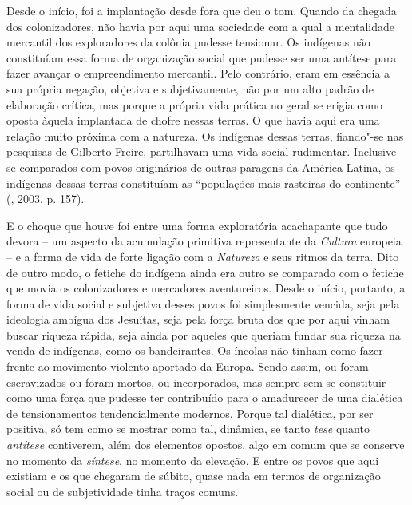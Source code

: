 Desde o início, foi a implantação desde fora que deu o tom. Quando da
chegada dos colonizadores, não havia por aqui uma sociedade com a qual a
mentalidade mercantil dos exploradores da colônia pudesse tensionar. Os
indígenas não constituíam essa forma de organização social que pudesse
ser uma antítese para fazer avançar o empreendimento mercantil. Pelo
contrário, eram em essência a sua própria negação, objetiva e
subjetivamente, não por um alto padrão de elaboração crítica, mas porque
a própria vida prática no geral se erigia como oposta àquela implantada
de chofre nessas terras. O que havia aqui era uma relação muito próxima
com a natureza. Os indígenas dessas terras, fiando"-se nas pesquisas de
Gilberto Freire, partilhavam uma vida social rudimentar. Inclusive se
comparados com povos originários de outras paragens da América Latina,
os indígenas dessas terras constituíam as ``populações mais rasteiras do
continente'' (, 2003, p. 157).

E o choque que houve foi entre uma forma exploratória acachapante que
tudo devora -- um aspecto da acumulação primitiva representante da
\emph{Cultura} europeia -- e a forma de vida de forte ligação com a
\emph{Natureza} e seus ritmos da terra. Dito de outro modo, o fetiche do
indígena ainda era outro se comparado com o fetiche que movia os
colonizadores e mercadores aventureiros. Desde o início, portanto, a
forma de vida social e subjetiva desses povos foi simplesmente vencida,
seja pela ideologia ambígua dos Jesuítas, seja pela força bruta dos que
por aqui vinham buscar riqueza rápida, seja ainda por aqueles que
queriam fundar sua riqueza na venda de indígenas, como os bandeirantes.
Os íncolas não tinham como fazer frente ao movimento violento aportado
da Europa. Sendo assim, ou foram escravizados ou foram mortos, ou
incorporados, mas sempre sem se constituir como uma força que pudesse
ter contribuído para o amadurecer de uma dialética de tensionamentos
tendencialmente modernos. Porque tal dialética, por ser positiva, só tem
como se mostrar como tal, dinâmica, se tanto \emph{tese} quanto
\emph{antítese} contiverem, além dos elementos opostos, algo em comum
que se conserve no momento da \emph{síntese}, no momento da elevação. E
entre os povos que aqui existiam e os que chegaram de súbito, quase nada
em termos de organização social ou de subjetividade tinha traços comuns.

